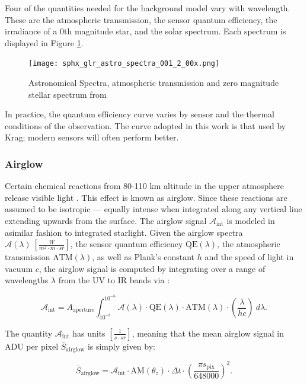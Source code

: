 Four of the quantities needed for the background model vary with wavelength. These are the atmospheric transmission, the sensor quantum efficiency, the irradiance of a 0th magnitude star, and the solar spectrum. Each spectrum is displayed in Figure \ref{fig:spectra}.

\begin{figure}[ht]
  \centering
  \texttt{[image: sphx\_glr\_astro\_spectra\_001\_2\_00x.png]}
  \caption{Astronomical Spectra, atmospheric transmission and zero magnitude stellar spectrum from \cite{krag2003}}
  \label{fig:spectra}
\end{figure}

In practice, the quantum efficiency curve varies by sensor and the thermal conditions of the
observation. The curve adopted in this work is that used by Krag; modern sensors will often
perform better.

\subsubsection{Airglow}

Certain chemical reactions from 80-110 km altitude in the upper atmosphere release visible light
\cite{krag2003}. This effect is known as
airglow. Since these reactions are assumed to be isotropic ---  equally intense when integrated along any
vertical line extending upwards from the surface. The airglow signal $\mathcal{A}_\mathrm{int}$ is modeled in asimilar fashion to integrated starlight. Given the airglow spectra $\mathcal{A}(\lambda) \: \left[ \frac{W}{m^2\cdot m \cdot sr} \right]$, the sensor quantum efficiency $\textrm{QE}(\lambda)$, the atmospheric transmission $\textrm{ATM}(\lambda)$, as well as Plank's constant $h$ and the speed of light in vacuum $c$, the airglow signal is computed by integrating over a range of wavelengths $\lambda$ from the UV to IR bands via \cite{krag2003}:

\begin{equation} \label{eq:aint}
 \mathcal{A}_\mathrm{int} = A_\mathrm{aperture}
  \int_{10^{-8}}^{10^{-6}}{ \mathcal{A}(\lambda) \cdot \textrm{QE}(\lambda) \cdot \textrm{ATM}(\lambda)
  \cdot \left( \frac{\lambda}{h c} \right) \: d\lambda}.
\end{equation}

The quantity $\mathcal{A}_\mathrm{int}$ has units $\left[ \frac{1}{s\cdot sr} \right]$, meaning that the mean airglow signal in ADU per pixel $\bar{S}_\mathrm{airglow}$ is simply given by:

\begin{equation} \label{eq:airglow_adu}
  \bar{S}_\mathrm{airglow} = \mathcal{A}_\mathrm{int} \cdot \textrm{AM}(\theta_z) \cdot \Delta t \cdot \left( \frac{\pi s_\mathrm{pix}}{648000} \right)^2.
\end{equation}

